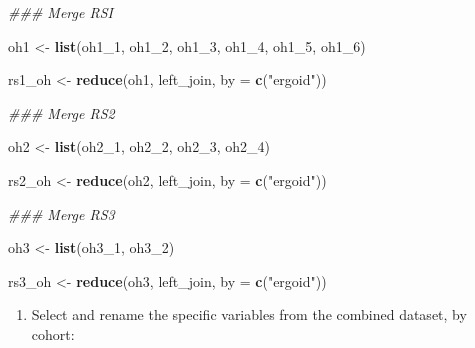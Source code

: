 \documentclass[]{book}
\newenvironment{Shaded}{\begin{snugshade}}{\end{snugshade}}
\newcommand{\CommentTok}[1]{\textcolor[rgb]{0.56,0.35,0.01}{\textit{#1}}}
\newcommand{\DataTypeTok}[1]{\textcolor[rgb]{0.13,0.29,0.53}{#1}}
\newcommand{\DecValTok}[1]{\textcolor[rgb]{0.00,0.00,0.81}{#1}}
\newcommand{\KeywordTok}[1]{\textcolor[rgb]{0.13,0.29,0.53}{\textbf{#1}}}
\newcommand{\NormalTok}[1]{#1}
\newcommand{\StringTok}[1]{\textcolor[rgb]{0.31,0.60,0.02}{#1}}
\providecommand{\tightlist}{%
  \setlength{\itemsep}{0pt}\setlength{\parskip}{0pt}}
\begin{document}
\begin{Shaded}
\begin{Highlighting}[]
\CommentTok{### Merge RSI}

\NormalTok{oh1 <-}\StringTok{ }\KeywordTok{list}\NormalTok{(oh1_}\DecValTok{1}\NormalTok{, oh1_}\DecValTok{2}\NormalTok{, oh1_}\DecValTok{3}\NormalTok{, oh1_}\DecValTok{4}\NormalTok{, oh1_}\DecValTok{5}\NormalTok{, oh1_}\DecValTok{6}\NormalTok{)}

\NormalTok{rs1_oh <-}\StringTok{ }\KeywordTok{reduce}\NormalTok{(oh1, left_join, }\DataTypeTok{by =} \KeywordTok{c}\NormalTok{(}\StringTok{"ergoid"}\NormalTok{))}

\CommentTok{### Merge RS2}

\NormalTok{oh2 <-}\StringTok{ }\KeywordTok{list}\NormalTok{(oh2_}\DecValTok{1}\NormalTok{, oh2_}\DecValTok{2}\NormalTok{, oh2_}\DecValTok{3}\NormalTok{, oh2_}\DecValTok{4}\NormalTok{)}

\NormalTok{rs2_oh <-}\StringTok{ }\KeywordTok{reduce}\NormalTok{(oh2, left_join, }\DataTypeTok{by =} \KeywordTok{c}\NormalTok{(}\StringTok{"ergoid"}\NormalTok{))}

\CommentTok{### Merge RS3}

\NormalTok{oh3 <-}\StringTok{ }\KeywordTok{list}\NormalTok{(oh3_}\DecValTok{1}\NormalTok{, oh3_}\DecValTok{2}\NormalTok{)}

\NormalTok{rs3_oh <-}\StringTok{ }\KeywordTok{reduce}\NormalTok{(oh3, left_join, }\DataTypeTok{by =} \KeywordTok{c}\NormalTok{(}\StringTok{"ergoid"}\NormalTok{))}
\end{Highlighting}
\end{Shaded}

\begin{enumerate}
\def\labelenumi{\arabic{enumi}.}
\setcounter{enumi}{3}
\tightlist
\item
  Select and rename the specific variables from the combined dataset, by cohort:
\end{enumerate}
\end{document}
